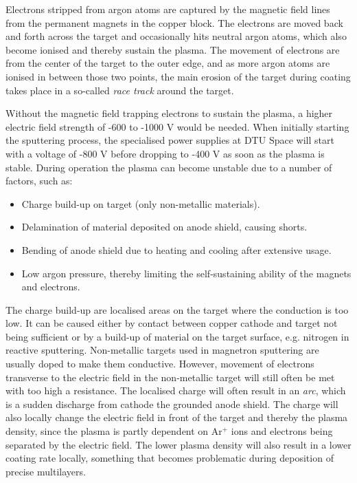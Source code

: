 Electrons stripped from argon atoms are captured by the magnetic field lines from the permanent magnets in the copper block. The electrons are moved back and forth across the target and occasionally hits neutral argon atoms, which also become ionised and thereby sustain the plasma. The movement of electrons are from the center of the target to the outer edge, and as more argon atoms are ionised in between those two points, the main erosion of the target during coating takes place in a so-called \emph{race track} around the target.

Without the magnetic field trapping electrons to sustain the plasma, a higher electric field strength of -600 to -1000 V would be needed. When initially starting the sputtering process, the specialised power supplies at DTU Space will start with a voltage of -800 V before dropping to -400 V as soon as the plasma is stable. During operation the plasma can become unstable due to a number of factors, such as:

\begin{itemize}
\item Charge build-up on target (only non-metallic materials).
\item Delamination of material deposited on anode shield, causing shorts.
\item Bending of anode shield due to heating and cooling after extensive usage.
\item Low argon pressure, thereby limiting the self-sustaining ability of the magnets and electrons.
\end{itemize}

The charge build-up are localised areas on the target where the conduction is too low. It can be caused either by contact between copper cathode and target not being sufficient or by a build-up of material on the target surface, e.g. nitrogen in reactive sputtering. Non-metallic targets used in magnetron sputtering are usually doped to make them conductive. However, movement of electrons transverse to the electric field in the non-metallic target will still often be met with too high a resistance. The localised charge will often result in an \emph{arc}, which is a sudden discharge from cathode the grounded anode shield. The charge will also locally change the electric field in front of the target and thereby the plasma density, since the plasma is partly dependent on Ar$^+$ ions and electrons being separated by the electric field. The lower plasma density will also result in a lower coating rate locally, something that becomes problematic during deposition of precise multilayers.

